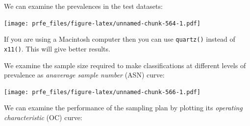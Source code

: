 \documentclass[12pt,a4paper]{book}
\newenvironment{Shaded}{\begin{snugshade}}{\end{snugshade}}
\newcommand{\DataTypeTok}[1]{\textcolor[rgb]{0.13,0.29,0.53}{#1}}
\newcommand{\KeywordTok}[1]{\textcolor[rgb]{0.13,0.29,0.53}{\textbf{#1}}}
\newcommand{\NormalTok}[1]{#1}
\newcommand{\OperatorTok}[1]{\textcolor[rgb]{0.81,0.36,0.00}{\textbf{#1}}}
\newcommand{\StringTok}[1]{\textcolor[rgb]{0.31,0.60,0.02}{#1}}
\theoremstyle{definition}
\theoremstyle{definition}
\theoremstyle{definition}
\theoremstyle{remark}
\begin{document}
We can examine the prevalences in the test datasets:

\begin{Shaded}
\end{Shaded}

\texttt{[image: prfe\_files/figure-latex/unnamed-chunk-564-1.pdf]}

If you are using a Macintosh computer then you can use \texttt{quartz()}
instead of \texttt{x11()}. This will give better results.

We examine the sample size required to make classifications at different
levels of prevalence as \emph{anaverage sample number} (ASN) curve:

\begin{Shaded}
\end{Shaded}

\texttt{[image: prfe\_files/figure-latex/unnamed-chunk-566-1.pdf]}

We can examine the performance of the sampling plan by plotting its
\emph{operating characteristic} (OC) curve:

\begin{Shaded}
\end{Shaded}
\end{document}
